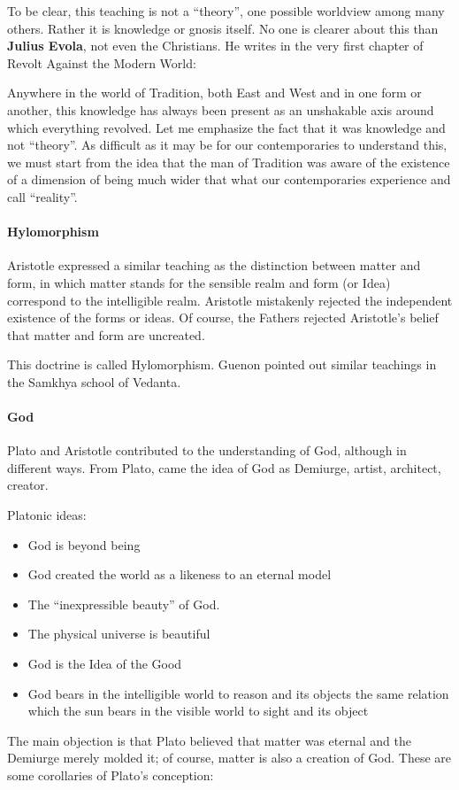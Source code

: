 To be clear, this teaching is not a “theory”, one possible worldview among many others. Rather it is knowledge or gnosis itself. No one is clearer about this than \textbf{Julius Evola}, not even the Christians. He writes in the very first chapter of Revolt Against the Modern World:

\begin{quotex}
Anywhere in the world of Tradition, both East and West and in one form or another, this knowledge has always been present as an unshakable axis around which everything revolved. Let me emphasize the fact that it was knowledge and not “theory”. As difficult as it may be for our contemporaries to understand this, we must start from the idea that the man of Tradition was aware of the existence of a dimension of being much wider that what our contemporaries experience and call “reality”. 

\end{quotex}
\paragraph{Hylomorphism}
Aristotle expressed a similar teaching as the distinction between matter and form, in which matter stands for the sensible realm and form (or Idea) correspond to the intelligible realm. Aristotle mistakenly rejected the independent existence of the forms or ideas. Of course, the Fathers rejected Aristotle's belief that matter and form are uncreated.

This doctrine is called Hylomorphism. Guenon pointed out similar teachings in the Samkhya school of Vedanta.

\paragraph{God}
Plato and Aristotle contributed to the understanding of God, although in different ways. From Plato, came the idea of God as Demiurge, artist, architect, creator.

Platonic ideas:

\begin{itemize}
\item God is beyond being 
\item God created the world as a likeness to an eternal model 
\item The “inexpressible beauty” of God. 
\item The physical universe is beautiful 
\item God is the Idea of the Good 
\item God bears in the intelligible world to reason and its objects the same relation which the sun bears in the visible world to sight and its object 
\end{itemize}
The main objection is that Plato believed that matter was eternal and the Demiurge merely molded it; of course, matter is also a creation of God. These are some corollaries of Plato's conception:

